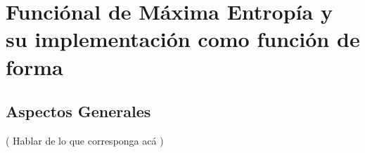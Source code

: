 \chapter{Funciónal de Máxima Entropía y su implementación como función de forma}
\section{Aspectos Generales}

( Hablar de lo que corresponga acá )
